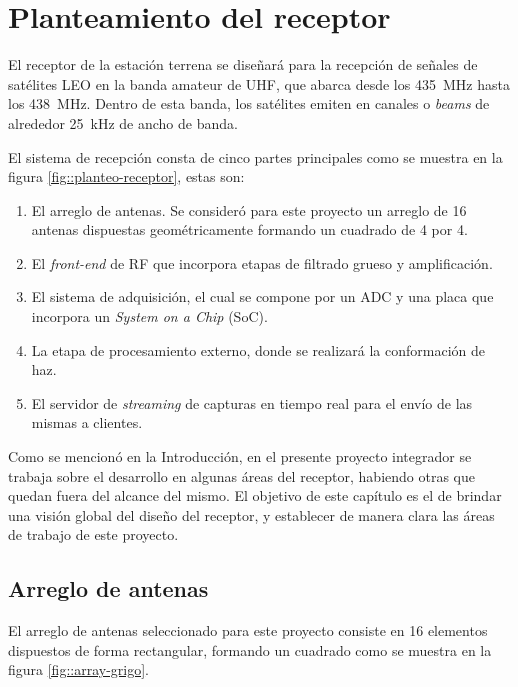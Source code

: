 \documentclass[../../main.tex]{subfiles}
\begin{document}
\graphicspath{{./figures}}
\chapter{Planteamiento del receptor}
El receptor de la estación terrena se diseñará para la recepción de señales de satélites LEO en la banda amateur de UHF, que abarca desde los 435~MHz hasta los 438~MHz. Dentro de esta banda, los satélites emiten en canales o \textit{beams} de alrededor 25~kHz de ancho de banda. 

El sistema de recepción consta de cinco partes principales como se muestra en la figura \ref{fig::planteo-receptor}, estas son:

\begin{enumerate}
    \item El arreglo de antenas. Se consideró para este proyecto un arreglo de 16 antenas dispuestas geométricamente formando un cuadrado de 4 por 4.
    \item El \textit{front-end} de RF que incorpora etapas de filtrado grueso y amplificación.
    \item El sistema de adquisición, el cual se compone por un ADC y una placa que incorpora un \textit{System on a Chip} (SoC).
    \item La etapa de procesamiento externo, donde se realizará la conformación de haz.
    \item El servidor de \textit{streaming} de capturas en tiempo real para el envío de las mismas a clientes.
\end{enumerate} 

Como se mencionó en la Introducción, en el presente proyecto integrador se trabaja sobre el desarrollo en algunas áreas del receptor, habiendo otras que quedan fuera del alcance del mismo. El objetivo de este capítulo es el de brindar una visión global del diseño del receptor, y establecer de manera clara las áreas de trabajo de este proyecto.


\section{Arreglo de antenas}
El arreglo de antenas seleccionado para este proyecto consiste en 16 elementos dispuestos de forma rectangular, formando un cuadrado como se muestra en la figura \ref{fig::array-grigo}.
\end{document}
